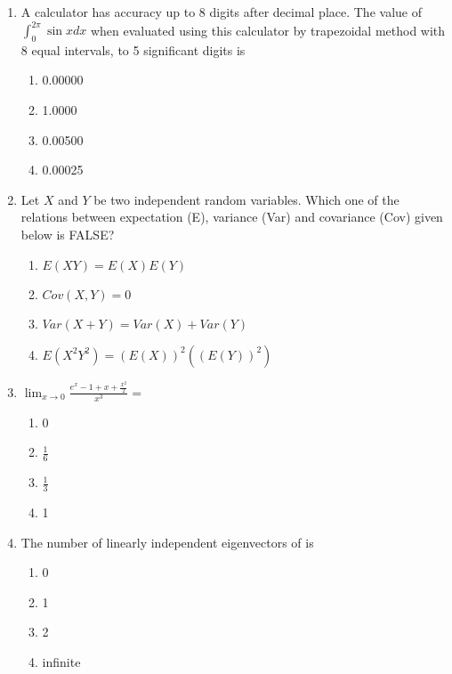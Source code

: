 \documentclass[journal]{IEEEtran}
\begin{document}
\begin{enumerate}
    \item A calculator has accuracy up to 8 digits after decimal place. The value of $\int_{0}^{2 \pi} \sin x d x$ when evaluated using this calculator by trapezoidal method with 8 equal intervals, to 5 significant digits is
\begin{multicols}{4}
 \begin{enumerate}
\item 0.00000
\item 1.0000
\item 0.00500
\item 0.00025
            \end{enumerate}
        \end{multicols}

    \item Let $X$ and $Y$ be two independent random variables. Which one of the relations between expectation (E), variance (Var) and covariance (Cov) given below is FALSE?
    \begin{multicols}{1}
            \begin{enumerate}
        \item $E(X Y)=E(X) E(Y)$
         \item $Cov(X,Y)=0$
         \item $Var(X+Y)=Var(X)+Var(Y)$
         \item $E(X^2Y^2)=(E(X))^2((E(Y))^2)$
            \end{enumerate}
        \end{multicols}

\item $\lim _{x \rightarrow 0} \frac {e^{x}-1+x+\frac{x^{2}}{2}}{x^{3}}=$
    \begin{multicols}{4}
            \begin{enumerate}
              \item 0
              \item $\frac{1}{6}$
              \item $\frac{1}{3}$
              \item 1
            \end{enumerate}
        \end{multicols}
     
    \item The number of linearly independent eigenvectors of  is
    \begin{multicols}{4}
            \begin{enumerate}
              \item 0
              \item 1
              \item 2
              \item infinite
            \end{enumerate}
        \end{multicols}
    

\end{enumerate}
\end{document}
